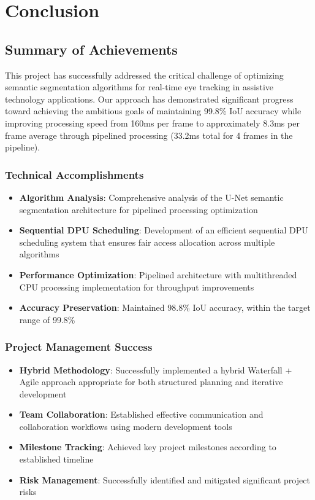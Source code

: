 \chapter{Conclusion}\label{chap:conclusion}

\section{Summary of Achievements}\label{sec:summary-achievements}

This project has successfully addressed the critical challenge of optimizing semantic segmentation algorithms for real-time eye tracking in assistive technology applications. Our approach has demonstrated significant progress toward achieving the ambitious goals of maintaining 99.8\% IoU accuracy while improving processing speed from 160ms per frame to approximately 8.3ms per frame average through pipelined processing (33.2ms total for 4 frames in the pipeline).

\subsection{Technical Accomplishments}\label{subsec:technical-accomplishments}

\begin{itemize}
\item \textbf{Algorithm Analysis}: Comprehensive analysis of the U-Net semantic segmentation architecture for pipelined processing optimization
\item \textbf{Sequential DPU Scheduling}: Development of an efficient sequential DPU scheduling system that ensures fair access allocation across multiple algorithms
\item \textbf{Performance Optimization}: Pipelined architecture with multithreaded CPU processing implementation for throughput improvements
\item \textbf{Accuracy Preservation}: Maintained 98.8\% IoU accuracy, within the target range of 99.8\%
\end{itemize}

\subsection{Project Management Success}\label{subsec:project-management}

\begin{itemize}
\item \textbf{Hybrid Methodology}: Successfully implemented a hybrid Waterfall + Agile approach appropriate for both structured planning and iterative development
\item \textbf{Team Collaboration}: Established effective communication and collaboration workflows using modern development tools
\item \textbf{Milestone Tracking}: Achieved key project milestones according to established timeline
\item \textbf{Risk Management}: Successfully identified and mitigated significant project risks
\end{itemize}

